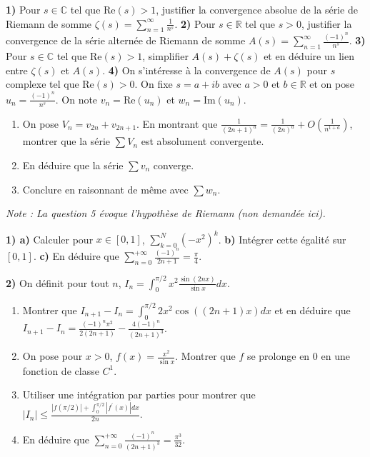 \begin{exercice}
\textbf{1)} Pour $s\in\mathbb{C}$ tel que $\text{Re}(s)>1$, justifier la convergence absolue de la série de Riemann de somme $\zeta(s)=\sum_{n=1}^{\infty}\frac{1}{n^{s}}$.
\textbf{2)} Pour $s\in\mathbb{R}$ tel que $s>0$, justifier la convergence de la série alternée de Riemann de somme $A(s)=\sum_{n=1}^{\infty}\frac{(-1)^{n}}{n^{s}}$.
\textbf{3)} Pour $s\in\mathbb{C}$ tel que $\text{Re}(s)>1$, simplifier $A(s)+\zeta(s)$ et en déduire un lien entre $\zeta(s)$ et $A(s)$.
\textbf{4)} On s'intéresse à la convergence de $A(s)$ pour $s$ complexe tel que $\text{Re}(s)>0$.
On fixe $s=a+ib$ avec $a>0$ et $b\in\mathbb{R}$ et on pose $u_{n}=\frac{(-1)^{n}}{n^{s}}$. On note $v_{n}=\text{Re}(u_{n})$ et $w_{n}=\text{Im}(u_{n})$.
\begin{enumerate}
    \item On pose $V_{n}=v_{2n}+v_{2n+1}$. En montrant que $\frac{1}{(2n+1)^{a}}=\frac{1}{(2n)^{a}}+O(\frac{1}{n^{1+a}})$, montrer que la série $\sum V_{n}$ est absolument convergente.
    \item En déduire que la série $\sum v_{n}$ converge.
    \item Conclure en raisonnant de même avec $\sum w_{n}$.
\end{enumerate}
\textit{Note : La question 5 évoque l'hypothèse de Riemann (non demandée ici).}
\end{exercice}

\begin{exercice}
\textbf{1) a)} Calculer pour $x\in[0,1]$, $\sum_{k=0}^{N}(-x^{2})^{k}$.
\textbf{b)} Intégrer cette égalité sur $[0, 1]$.
\textbf{c)} En déduire que $\sum_{n=0}^{+\infty}\frac{(-1)^{n}}{2n+1}=\frac{\pi}{4}$.

\textbf{2)} On définit pour tout $n$, $I_{n}=\int_{0}^{\pi/2}x^{2}\frac{\sin(2nx)}{\sin x}dx$.
\begin{enumerate}
    \item Montrer que $I_{n+1}-I_{n}=\int_{0}^{\pi/2}2x^{2}\cos((2n+1)x)dx$ et en déduire que $I_{n+1}-I_{n}=\frac{(-1)^{n}\pi^{2}}{2(2n+1)}-\frac{4(-1)^{n}}{(2n+1)^{3}}$.
    \item On pose pour $x>0$, $f(x)=\frac{x^{2}}{\sin x}$. Montrer que $f$ se prolonge en 0 en une fonction de classe $C^{1}$.
    \item Utiliser une intégration par parties pour montrer que $|I_{n}|\le\frac{|f(\pi/2)|+\int_{0}^{\pi/2}|f^{\prime}(x)|dx}{2n}$.
    \item En déduire que $\sum_{n=0}^{+\infty}\frac{(-1)^{n}}{(2n+1)^{3}}=\frac{\pi^{3}}{32}$. %
\end{enumerate}
\end{exercice}

